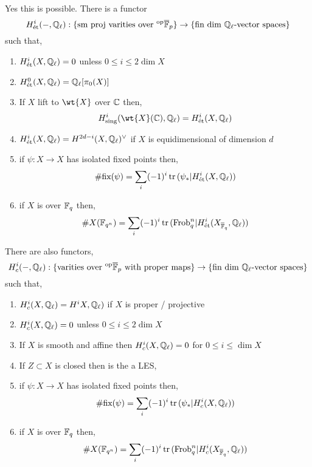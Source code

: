 \documentclass[12pt]{article}
\newcommand{\Frob}{\mathrm{Frob}}
\begin{document}
\begin{theorem} 
Yes this is possible. There is a functor \[ H^i_{\text{\'{e}t}}(-, \mathbb{Q}_\ell) : \{ \text{sm proj varities over }^{\mathrm{op}} \overline{\mathbb{F}}_p \} \to \{ \text{fin dim } \mathbb{Q}_{\ell}\text{-vector spaces} \} \] 
such that,
\begin{enumerate}
\item $H_{\text{\'{e}t}}^i(X, \mathbb{Q}_\ell) = 0$ unless $0 \le i \le 2 \dim{X}$
\item $H^0_{\text{\'{e}t}}(X, \mathbb{Q}_\ell) = \mathbb{Q}_\ell[\pi_0(X)]$

\item If $X$ lift to $\wt{X}$ over $\mathbb{C}$ then,
\[ H^i_{\text{sing}}(\wt{X}(\CC), \Q_\ell) = H^i_{\et}(X, \Q_\ell) \]

\item $H^i_{\text{\'{e}t}}(X, \mathbb{Q}_\ell) = H^{2 d - i}(X, \mathbb{Q}_\ell)^\vee$ if $X$ is equidimensional of dimension $d$

\item if $\psi : X \to X$ has isolated fixed points then,
\[ \# \text{fix}(\psi) = \sum_i (-1)^i \operatorname{\mathrm{tr}}{( \psi_* | H^i_{\text{\'{e}t}}(X, \mathbb{Q}_\ell))} \]

\item if $X$ is over $\mathbb{F}_q$ then,
\[ \# X(\FF_{q^n}) = \sum_{i} (-1)^i \tr{( \Frob_{q}^n | H^i_{\et}(X_{\overline{\FF}_{q}}, \Q_\ell))} \]
\end{enumerate}
\end{theorem}



\begin{theorem}
There are also functors,
\[ H^i_{c}(-, \mathbb{Q}_\ell) : \{ \text{varities over }^{\mathrm{op}} \overline{\mathbb{F}}_p \text{ with proper maps} \} \to \{ \text{fin dim } \mathbb{Q}_{\ell}\text{-vector spaces} \} \] 
such that,
\begin{enumerate}
\item $H_c^i(X, \mathbb{Q}_\ell) = H^iX, \mathbb{Q}_\ell)$ if $X$ is proper / projective
\item $H_{c}^i(X, \mathbb{Q}_\ell) = 0$ unless $0 \le i \le 2 \dim{X}$

\item If $X$ is smooth and affine then $H^i_c(X, \mathbb{Q}_\ell) = 0$ for $0 \le i \le \dim{X}$

\item If $Z \subset X$ is closed then is the a LES,
\begin{center}
\end{center}

\item if $\psi : X \to X$ has isolated fixed points then,
\[ \# \text{fix}(\psi) = \sum_i (-1)^i \operatorname{\mathrm{tr}}{( \psi_* | H^i_{c}(X, \mathbb{Q}_\ell))} \]

\item if $X$ is over $\mathbb{F}_q$ then,
\[ \# X(\FF_{q^n}) = \sum_{i} (-1)^i \tr{( \Frob_{q}^n | H^i_{c}(X_{\overline{\FF}_{q}}, \Q_\ell))} \]
\end{enumerate}
\end{theorem}
\end{document}
